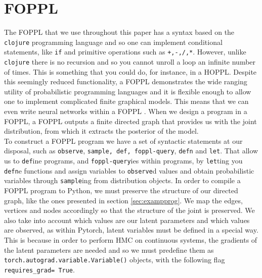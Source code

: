 \documentclass[twoside]{article}
\begin{document}
\section{FOPPL}
\label{sec:foppl}
The FOPPL\citep{woodgroup2017} that we use throughout this paper has a syntax based on the \texttt{clojure} \citep{Hickey2008} programming language and so one can implement conditional statements, like \texttt{if} and primitive operations such as \texttt{+,-,/,*}. However, unlike \texttt{clojure} there is no recursion and so you cannot unroll a loop an infinite number of times. This is something that you could do, for instance, in a HOPPL. Despite this seemingly reduced functionality, a FOPPL demonstrates the wide ranging utility of probabilistic programming languages and it is flexible enough to allow one to implement complicated finite graphical models. This means that we can even write neural networks within a FOPPL \citep{woodgroup2017}. When we design a program in a FOPPL, a FOPPL outputs a finite directed graph that provides us with the joint distribution, from which it extracts the posterior of the model.\\
To construct a FOPPL program we have a set of syntactic statements at our disposal, such as \texttt{observe}, \texttt{sample, def, foppl-query}, \texttt{defn} and \texttt{let}. That allow us to \texttt{def}ine programs, and \texttt{foppl-query}ies within programs,  by \texttt{let}ting you \texttt{defn}e functions and assign variables to \texttt{observe}d values and obtain probabilistic variables through \texttt{sample}ing from distribution objects. In order to compile a FOPPL program to Python, we must preserve the structure of our directed graph, like the ones presented in section \ref{sec:exampprog}.  We map the edges, vertices and nodes accordingly so that the structure of the joint is preserved. We also take into account which values are our latent parameters and which values are observed, as within Pytorch, latent variables must be defined in a special way. This is because in order to perform HMC on continuous systems, the gradients of the latent parameters are needed and so we must predefine them as  \texttt{torch.autograd.variable.Variable()} objects, with the following flag \texttt{requires_grad= True}.\\
\end{document}
